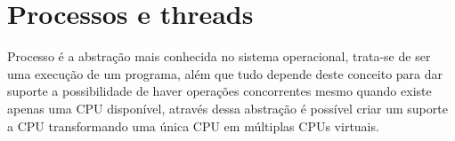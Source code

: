 \chapter{Processos e threads}\label{cap:ProcessosThreads}

Processo é a abstração mais conhecida no sistema operacional, trata-se de ser uma execução de um programa, além que tudo depende deste conceito para  dar suporte a possibilidade de haver operações concorrentes mesmo quando existe apenas uma CPU disponível, através dessa abstração é possível criar um suporte a CPU  transformando uma única CPU em múltiplas CPUs virtuais.\\







